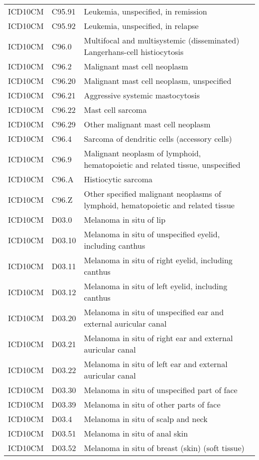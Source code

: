 \begin{longtable}{p{}p{}p{}}
  ICD10CM & C95.91 & Leukemia, unspecified, in remission \\ 
  ICD10CM & C95.92 & Leukemia, unspecified, in relapse \\ 
  ICD10CM & C96.0 & Multifocal and multisystemic (disseminated) Langerhans-cell histiocytosis \\ 
  ICD10CM & C96.2 & Malignant mast cell neoplasm \\ 
  ICD10CM & C96.20 & Malignant mast cell neoplasm, unspecified \\ 
  ICD10CM & C96.21 & Aggressive systemic mastocytosis \\ 
  ICD10CM & C96.22 & Mast cell sarcoma \\ 
  ICD10CM & C96.29 & Other malignant mast cell neoplasm \\ 
  ICD10CM & C96.4 & Sarcoma of dendritic cells (accessory cells) \\ 
  ICD10CM & C96.9 & Malignant neoplasm of lymphoid, hematopoietic and related tissue, unspecified \\ 
  ICD10CM & C96.A & Histiocytic sarcoma \\ 
  ICD10CM & C96.Z & Other specified malignant neoplasms of lymphoid, hematopoietic and related tissue \\ 
  ICD10CM & D03.0 & Melanoma in situ of lip \\ 
  ICD10CM & D03.10 & Melanoma in situ of unspecified eyelid, including canthus \\ 
  ICD10CM & D03.11 & Melanoma in situ of right eyelid, including canthus \\ 
  ICD10CM & D03.12 & Melanoma in situ of left eyelid, including canthus \\ 
  ICD10CM & D03.20 & Melanoma in situ of unspecified ear and external auricular canal \\ 
  ICD10CM & D03.21 & Melanoma in situ of right ear and external auricular canal \\ 
  ICD10CM & D03.22 & Melanoma in situ of left ear and external auricular canal \\ 
  ICD10CM & D03.30 & Melanoma in situ of unspecified part of face \\ 
  ICD10CM & D03.39 & Melanoma in situ of other parts of face \\ 
  ICD10CM & D03.4 & Melanoma in situ of scalp and neck \\ 
  ICD10CM & D03.51 & Melanoma in situ of anal skin \\ 
  ICD10CM & D03.52 & Melanoma in situ of breast (skin) (soft tissue) \\ 

\end{longtable}
